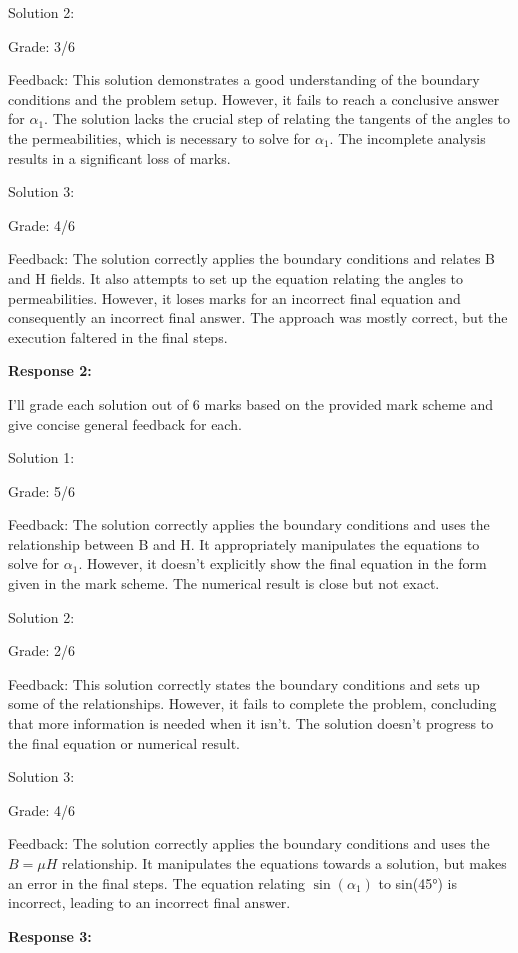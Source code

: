 \documentclass[a4paper,11pt]{article}
\begin{document}
Solution 2:

Grade: 3/6

Feedback:
This solution demonstrates a good understanding of the boundary conditions and the problem setup. However, it fails to reach a conclusive answer for \(\alpha_1\). The solution lacks the crucial step of relating the tangents of the angles to the permeabilities, which is necessary to solve for \(\alpha_1\). The incomplete analysis results in a significant loss of marks.

Solution 3:

Grade: 4/6

Feedback:
The solution correctly applies the boundary conditions and relates B and H fields. It also attempts to set up the equation relating the angles to permeabilities. However, it loses marks for an incorrect final equation and consequently an incorrect final answer. The approach was mostly correct, but the execution faltered in the final steps.

\bigskip
\textbf{Response 2:}

I'll grade each solution out of 6 marks based on the provided mark scheme and give concise general feedback for each.

Solution 1:

Grade: 5/6

Feedback: The solution correctly applies the boundary conditions and uses the relationship between B and H. It appropriately manipulates the equations to solve for \(\alpha_1\). However, it doesn't explicitly show the final equation in the form given in the mark scheme. The numerical result is close but not exact.

Solution 2:

Grade: 2/6

Feedback: This solution correctly states the boundary conditions and sets up some of the relationships. However, it fails to complete the problem, concluding that more information is needed when it isn't. The solution doesn't progress to the final equation or numerical result.

Solution 3:

Grade: 4/6

Feedback: The solution correctly applies the boundary conditions and uses the \(B = \mu H\) relationship. It manipulates the equations towards a solution, but makes an error in the final steps. The equation relating \( \sin(\alpha_1) \) to sin(45°) is incorrect, leading to an incorrect final answer.

\bigskip
\textbf{Response 3:}
\end{document}

